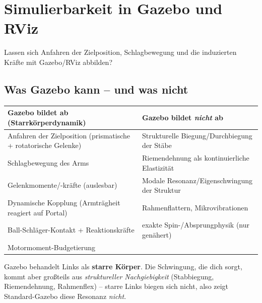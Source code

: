 
\chapter{Simulierbarkeit in Gazebo und RViz}

Lassen sich Anfahren der Zielposition, Schlagbewegung und die induzierten
Kräfte mit Gazebo/RViz abbilden?

\section{Was Gazebo kann -- und was nicht}
\begin{longtable}{@{}p{7.4cm}p{7.2cm}@{}}
\toprule
\textbf{Gazebo bildet ab (Starrkörperdynamik)} & \textbf{Gazebo bildet \emph{nicht} ab} \\
\midrule
Anfahren der Zielposition (prismatische + rotatorische Gelenke) & Strukturelle Biegung/Durchbiegung der Stäbe \\
Schlagbewegung des Arms      & Riemendehnung als kontinuierliche Elastizität \\
Gelenkmomente/-kräfte (auslesbar) & Modale Resonanz/Eigenschwingung der Struktur \\
Dynamische Kopplung (Armträgheit reagiert auf Portal) & Rahmenflattern, Mikrovibrationen \\
Ball-Schläger-Kontakt + Reaktionskräfte & exakte Spin-/Absprungphysik (nur genähert) \\
Motormoment-Budgetierung      & \\
\bottomrule
\end{longtable}

\begin{warnbox}[title=Der Kernpunkt]
Gazebo behandelt Links als \textbf{starre Körper}. Die Schwingung, die dich
sorgt, kommt aber großteils aus \emph{struktureller Nachgiebigkeit}
(Stabbiegung, Riemendehnung, Rahmenflex) -- starre Links biegen sich nicht,
also zeigt Standard-Gazebo diese Resonanz \emph{nicht}.
\end{warnbox}

